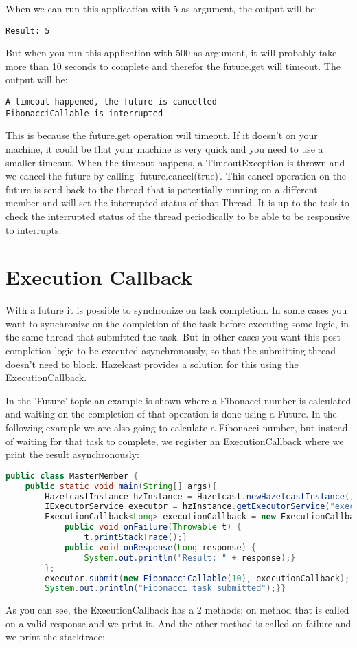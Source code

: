 When we can run this application with 5 as argument, the output will be: 
\begin{lstlisting}
Result: 5
\end{lstlisting}
But when you run this application with 500 as argument, it will probably take more than 10 seconds to complete and therefor the future.get will timeout. The output will be:
\begin{lstlisting}
A timeout happened, the future is cancelled
FibonacciCallable is interrupted
\end{lstlisting}
This is because the future.get operation will timeout. If it doesn't on your machine, it could be that your machine is very quick and you need to use a smaller timeout. When the timeout happens, a TimeoutException is thrown and we cancel the future by calling 'future.cancel(true)'. This cancel operation on the future is send back to the thread that is potentially running on a different member and will set the interrupted status of that Thread. It is up to the task to check the interrupted status of the thread periodically to be able to be responsive to interrupts.

\section{Execution Callback}
With a future it is possible to synchronize on task completion. In some cases you want to synchronize on the completion of the task before executing some logic, in the same thread that submitted the task. But in other cases you want this post completion logic to be executed asynchronously, so that the submitting thread doesn't need to block. Hazelcast provides a solution for this using the ExecutionCallback.

In the 'Future' topic an example is shown where a Fibonacci number is calculated and waiting on the completion of that operation is done using a Future. In the following example we are also going to calculate a Fibonacci number, but instead of waiting for that task to complete, we register an ExecutionCallback where we print the result asynchronously:
\begin{lstlisting}[language=java]
public class MasterMember {
    public static void main(String[] args){
        HazelcastInstance hzInstance = Hazelcast.newHazelcastInstance();
        IExecutorService executor = hzInstance.getExecutorService("executor");
        ExecutionCallback<Long> executionCallback = new ExecutionCallback<Long>() {
            public void onFailure(Throwable t) {
                t.printStackTrace();}
            public void onResponse(Long response) {
                System.out.println("Result: " + response);}
        };
        executor.submit(new FibonacciCallable(10), executionCallback);
        System.out.println("Fibonacci task submitted");}}
\end{lstlisting}
As you can see, the ExecutionCallback has a 2 methods; on method that is called on a valid response and we print it. And the other method is called on failure and we print the stacktrace: 

